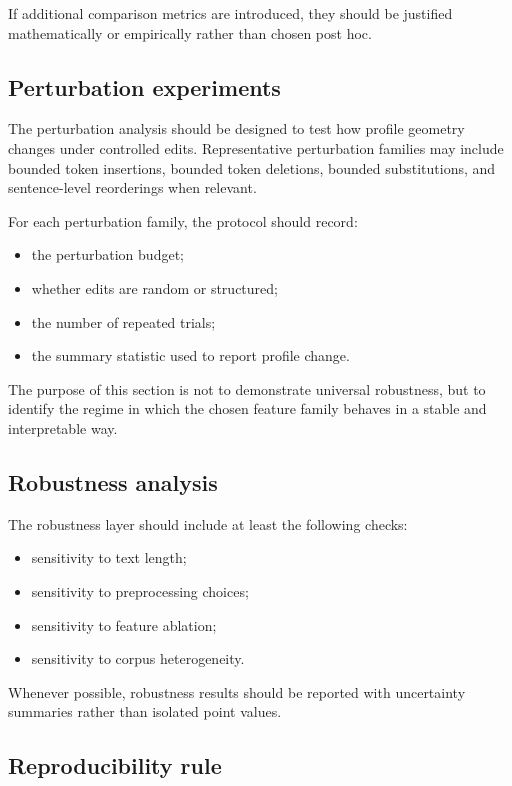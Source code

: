 \documentclass[11pt]{article}
\begin{document}
If additional comparison metrics are introduced, they should be justified mathematically or empirically rather than chosen post hoc.

\subsection{Perturbation experiments}

The perturbation analysis should be designed to test how profile geometry changes under controlled edits. Representative perturbation families may include bounded token insertions, bounded token deletions, bounded substitutions, and sentence-level reorderings when relevant.

For each perturbation family, the protocol should record:
\begin{itemize}
    \item the perturbation budget;
    \item whether edits are random or structured;
    \item the number of repeated trials;
    \item the summary statistic used to report profile change.
\end{itemize}

The purpose of this section is not to demonstrate universal robustness, but to identify the regime in which the chosen feature family behaves in a stable and interpretable way.

\subsection{Robustness analysis}

The robustness layer should include at least the following checks:
\begin{itemize}
    \item sensitivity to text length;
    \item sensitivity to preprocessing choices;
    \item sensitivity to feature ablation;
    \item sensitivity to corpus heterogeneity.
\end{itemize}

Whenever possible, robustness results should be reported with uncertainty summaries rather than isolated point values.

\subsection{Reproducibility rule}
\end{document}
